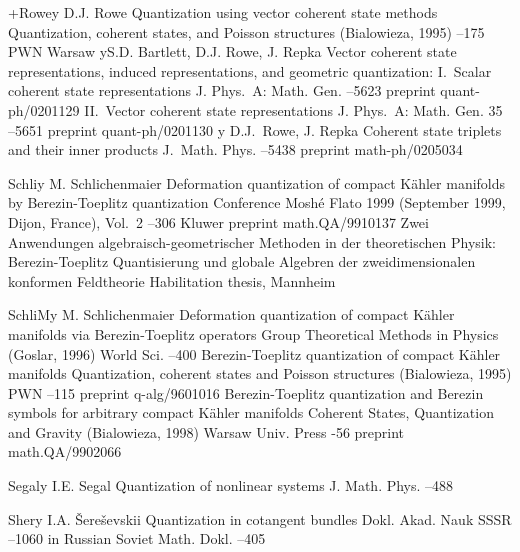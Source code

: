 \documentclass[12pt]{amsart}
\numberwithin{equation}{section}
\theoremstyle{remark}
\newcommand{\by}{\mathbf y}
\begin{document}
\begin{thebibliography}{199}
 +Rowe\by{ D.J. Rowe \paper Quantization using vector coherent state
methods \inbook Quantization, coherent states, and Poisson structures
(Bialowieza, 1995) --175 \publ PWN \publaddr Warsaw 
\moreref \by S.D. Bartlett, D.J. Rowe, J. Repka \paper Vector coherent state
representations, induced representations, and geometric quantization:
I.~Scalar coherent state representations \jour J. Phys.~A: Math. Gen. 
 --5623 \paperinfo preprint quant-ph/0201129 \moreref \paper
II.~Vector coherent state representations \jour  J. Phys.~A: Math. Gen. 35  --5651 \paperinfo preprint quant-ph/0201130 \moreref \by
D.J.~Rowe, J. Repka \paper Coherent state triplets and their inner products
\jour J.~Math. Phys.   --5438 \paperinfo preprint
math-ph/0205034}

 Schli\by{ M. Schlichenmaier \paper Deformation quantization of compact
K\"ahler manifolds by Berezin-Toeplitz quantization \inbook Conference Mosh\'e
Flato 1999 (September 1999, Dijon, France), Vol.~2 --306 \publ Kluwer
 \paperinfo preprint math.QA/9910137 \moreref \book Zwei Anwendungen
algebraisch-geometrischer Methoden in der theoretischen Physik:
Berezin-Toeplitz Quantisierung und globale Algebren der zweidimensionalen
konformen Feldtheorie \bookinfo Habilitation thesis, Mannheim }

 SchliM\by{ M. Schlichenmaier \paper Deformation quantization of compact
K\"ahler manifolds via Berezin-Toeplitz operators \inbook Group Theoretical
Methods in Physics (Goslar, 1996) \publ World Sci.  --400
\moreref \paper Berezin-Toeplitz quantization of compact K\"ahler manifolds
\inbook Quantization, coherent states and Poisson structures (Bialowieza, 1995)
\publ PWN --115  \paperinfo preprint q-alg/9601016 \moreref
\paper Berezin-Toeplitz quantization and Berezin symbols for arbitrary compact
K\"ahler manifolds \inbook  Coherent States, Quantization and Gravity
(Bialowieza, 1998)  \publ Warsaw Univ. Press  -56 \paperinfo
preprint math.QA/9902066}

 Segal\by{ I.E. Segal \paper Quantization of nonlinear systems \jour J.
Math. Phys.   --488}

 Sher\by{ I.A. \v Sere\v sevskii \paper Quantization in cotangent bundles
\jour Dokl. Akad. Nauk SSSR   --1060 \lang in
Russian \transl Soviet Math. Dokl.   --405}


\end{thebibliography}
\end{document}
